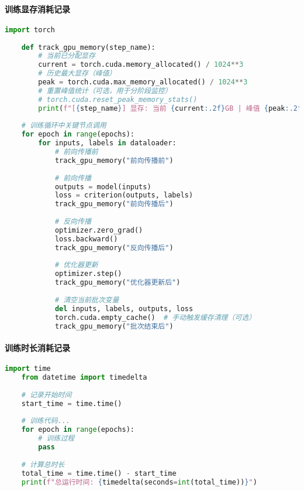 \paragraph{训练显存消耗记录}
\begin{lstlisting}[language=python,caption={查询显存},label=code:train_memory]
	import torch
	
	def track_gpu_memory(step_name):
		# 当前已分配显存
		current = torch.cuda.memory_allocated() / 1024**3
		# 历史最大显存（峰值）
		peak = torch.cuda.max_memory_allocated() / 1024**3
		# 重置峰值统计（可选，用于分阶段监控）
		# torch.cuda.reset_peak_memory_stats()
		print(f"[{step_name}] 显存: 当前 {current:.2f}GB | 峰值 {peak:.2f}GB")
	
	# 训练循环中关键节点调用
	for epoch in range(epochs):
		for inputs, labels in dataloader:
			# 前向传播前
			track_gpu_memory("前向传播前")
			
			# 前向传播
			outputs = model(inputs)
			loss = criterion(outputs, labels)
			track_gpu_memory("前向传播后")
			
			# 反向传播
			optimizer.zero_grad()
			loss.backward()
			track_gpu_memory("反向传播后")
			
			# 优化器更新
			optimizer.step()
			track_gpu_memory("优化器更新后")
			
			# 清空当前批次变量
			del inputs, labels, outputs, loss
			torch.cuda.empty_cache()  # 手动触发缓存清理（可选）
			track_gpu_memory("批次结束后")
\end{lstlisting}

\paragraph{训练时长消耗记录}
\begin{lstlisting}[language=python,caption={训练时长记录},label=code:train_time]
	import time
	from datetime import timedelta
	
	# 记录开始时间
	start_time = time.time()
	
	# 训练代码...
	for epoch in range(epochs):
		# 训练过程
		pass
	
	# 计算总时长
	total_time = time.time() - start_time
	print(f"总运行时间: {timedelta(seconds=int(total_time))}")
\end{lstlisting}

